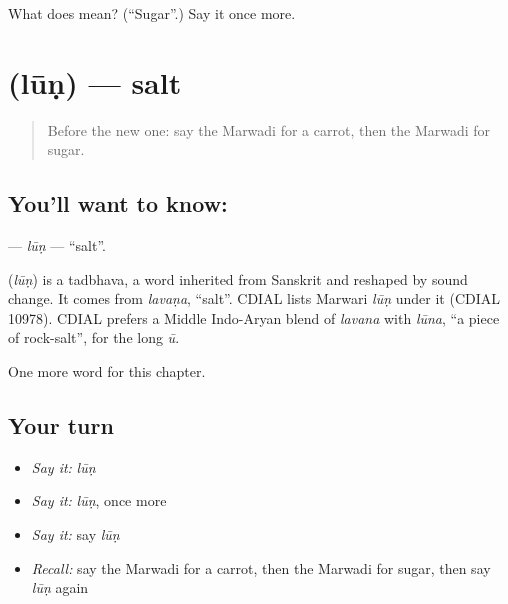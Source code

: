 \begin{tcolorbox}[breakable,colback=teal!4,colframe=teal!35!black,title={Before you move on}]
What does  mean? (\textquotedblleft{}Sugar\textquotedblright{}.) Say it once more.
\end{tcolorbox}
\section[\texorpdfstring{\mw{लूण} (lūṇ)}{लूण (lūṇ)}]{ (lūṇ) — salt}

\label{lesson:MW-C60-lun}



\begin{quote}
Before the new one: say the Marwadi for a carrot, then the Marwadi for sugar.
\end{quote}

\subsection*{You'll want to know: }
\textbf{} — \emph{lūṇ} — \textquotedblleft{}salt\textquotedblright{}.

\begin{cousinweb}
\textbf{} (\emph{lūṇ}) is a tadbhava, a word inherited from Sanskrit and reshaped by sound change. It comes from \emph{lavaṇa}, \textquotedblleft{}salt\textquotedblright{}. CDIAL lists Marwari \emph{lūṇ} under it (CDIAL 10978). CDIAL prefers a Middle Indo-Aryan blend of \emph{lavana} with \emph{lūna}, \textquotedblleft{}a piece of rock-salt\textquotedblright{}, for the long \emph{ū}.
\end{cousinweb}

\begin{grammarlens}[title={What you've built}]
One more word for this chapter.
\end{grammarlens}

\subsection*{Your turn}
\begin{itemize}
\raggedright
  \item \emph{Say it:} \emph{lūṇ}
  \item \emph{Say it:} \emph{lūṇ}, once more
  \item \emph{Say it:} say \emph{lūṇ}
  \item \emph{Recall:} say the Marwadi for a carrot, then the Marwadi for sugar, then say \emph{lūṇ} again
\end{itemize}

